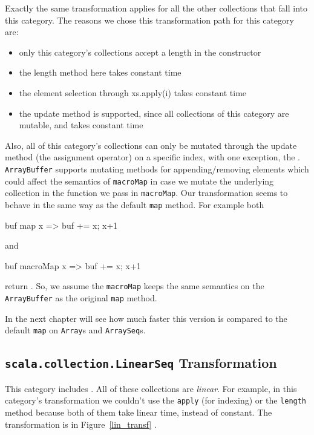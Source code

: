 Exactly the same transformation applies for all the other collections that fall
into this category. The reasons we chose this transformation path for this
category are:

\begin{itemize}
 \item 
  only this category's collections accept a length in the constructor
 \item
  the length method here takes constant time
 \item
  the element selection through xs.apply(i) takes constant time
 \item
  the update method is supported, since all collections of this category are
mutable, and takes constant time
\end{itemize}

Also, all of this category's collections can only be mutated through the
update method (the assignment operator) on a specific index, with one
exception, the . 
\texttt{ArrayBuffer} supports mutating methods for appending/removing elements which could affect the
semantics of \texttt{macroMap} in case we mutate the underlying collection in the
function we pass in \texttt{macroMap}. Our transformation seems to behave in the same
way as the default \texttt{map} method. For example both
\begin{scalaCode}
buf map {x => buf += x; x+1 }
\end{scalaCode}
and
\begin{scalaCode}
buf macroMap { x => buf += x; x+1 }
\end{scalaCode}
return .
So, we assume the \texttt{macroMap} keeps the
same semantics on the \texttt{ArrayBuffer} as the original \texttt{map} method.

In the next chapter will see how much faster this version is compared to the
default \texttt{map} on \texttt{Array}s and \texttt{ArraySeq}s.

\subsection{\texttt{scala.collection.LinearSeq} Transformation}

This category includes . All of these collections are \emph{linear}.
For example, in this category's transformation we couldn't use the \texttt{apply} (for
indexing) or the \texttt{length} method because both of them take linear time, instead of
constant. The transformation is in Figure~\ref{lin_transf} .

